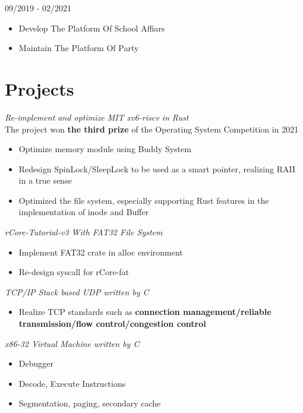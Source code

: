 \documentclass{cv}
\begin{document}
 {09/2019 - 02/2021}

\begin{itemize}
  \item Develop The Platform Of School Affiars
  \item Maintain The Platform Of Party
\end{itemize}


\section{Projects}

{\it Re-implement and optimize MIT xv6-riscv in Rust}
\vspace{0.4ex}
\\
The project won \textbf{the third prize} of the Operating System Competition in 2021
\begin{itemize}
  \item Optimize memory module using Buddy System 
  \item Redesign SpinLock/SleepLock to be used as a smart pointer, realizing RAII in a true sense
  \item Optimized the file system, especially supporting Rust features in the implementation of inode and Buffer
\end{itemize}


{\it rCore-Tutorial-v3 With FAT32 File System}
\vspace{0.4ex}
\begin{itemize}
  \item Implement FAT32 crate in alloc environment
  \item Re-design syscall for rCore-fat
\end{itemize}


{\it TCP/IP Stack based UDP written by C}
\vspace{0.4ex}
\begin{itemize}
  \item Realize TCP standards such as \textbf{connection management/reliable transmission/flow control/congestion control}
\end{itemize}


{\it x86-32 Virtual Machine written by C}
\vspace{0.4ex}
\begin{itemize}
  \item Debugger
  \item Decode, Execute Instructions
  \item Segmentation, paging, secondary cache
\end{itemize}
\end{document}
